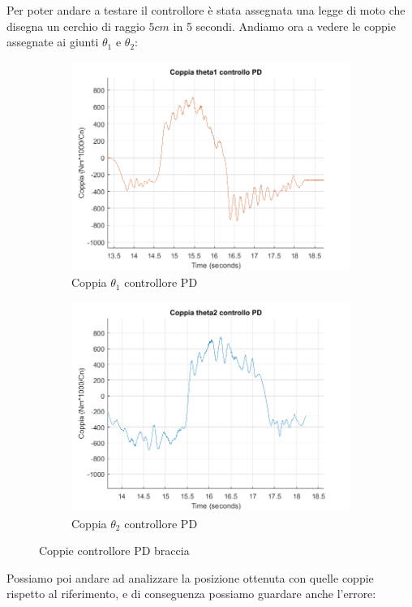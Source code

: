 \par Per poter andare a testare il controllore è stata assegnata una legge di moto che disegna un cerchio di raggio $5cm$ in 5 secondi. Andiamo ora a vedere le coppie assegnate ai giunti $\theta_1$ e $\theta_2$:
\begin{figure}[!ht]
\begin{subfigure}{.5\textwidth}
  \centering
  \includegraphics[width=.8\linewidth]{Immagini/Traiettorie/CoppiaT1PD}  
  \caption{Coppia $\theta_1$ controllore PD}
  \label{fig:sub-coppiaPD1}
\end{subfigure}
\begin{subfigure}{.5\textwidth}
  \centering
  \includegraphics[width=.8\linewidth]{Immagini/Traiettorie/CoppiaT2PD}  
  \caption{Coppia $\theta_2$ controllore PD}
  \label{fig:sub-coppiaPD2}
\end{subfigure}
\caption{Coppie controllore PD braccia}
\end{figure}
Possiamo poi andare ad analizzare la posizione ottenuta con quelle coppie rispetto al riferimento, e di conseguenza possiamo guardare anche l'errore:
